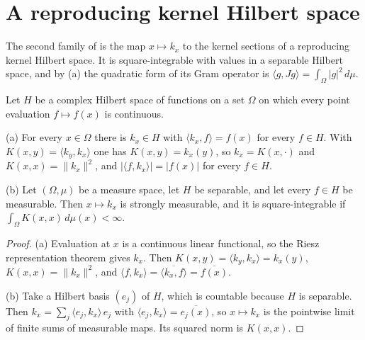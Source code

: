 \section{A reproducing kernel Hilbert space}

The second family of  is the map $x \mapsto k_x$ to the
kernel sections of a reproducing kernel Hilbert space. It is square-integrable with
values in a separable Hilbert space, and by (a) the quadratic
form of its Gram operator is $\langle g, J g \rangle = \int_\Omega |g|^2 \, d\mu$.

\begin{lemma}
\label{lem:kernel-sections}
\leanok
Let $H$ be a complex Hilbert space of functions on a set $\Omega$ on which every point
evaluation $f \mapsto f(x)$ is continuous.

(a) For every $x \in \Omega$ there is $k_x \in H$ with $\langle k_x, f \rangle = f(x)$ for
every $f \in H$. With $K(x, y) = \langle k_y, k_x \rangle$ one has $K(x, y) = k_x(y)$, so
$k_x = K(x, \cdot)$ and $K(x, x) = \|k_x\|^2$, and $|\langle f, k_x \rangle| = |f(x)|$ for
every $f \in H$.

(b) Let $(\Omega, \mu)$ be a measure space, let $H$ be separable, and let every $f \in H$
be measurable. Then $x \mapsto k_x$ is strongly measurable, and it is square-integrable if
$\int_\Omega K(x, x) \, d\mu(x) < \infty$.
\end{lemma}

\begin{proof}
\leanok
(a) Evaluation at $x$ is a continuous linear functional, so the Riesz representation
theorem gives $k_x$. Then $K(x, y) = \langle k_y, k_x \rangle = k_x(y)$,
$K(x, x) = \|k_x\|^2$, and $\langle f, k_x \rangle = \overline{\langle k_x, f \rangle}
= \overline{f(x)}$.

(b) Take a Hilbert basis $(e_j)$ of $H$, which is countable because $H$ is separable. Then
$k_x = \sum_j \langle e_j, k_x \rangle \, e_j$ with
$\langle e_j, k_x \rangle = \overline{e_j(x)}$, so $x \mapsto k_x$ is the pointwise limit
of finite sums of measurable maps. Its squared norm is $K(x, x)$.
\end{proof}

